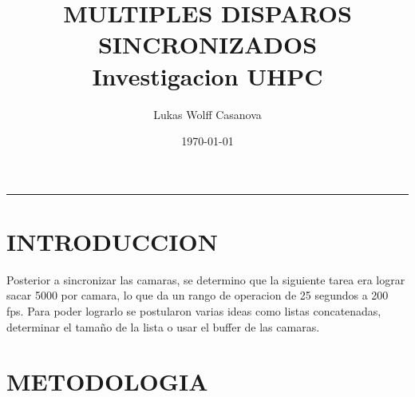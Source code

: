 \documentclass{article}
\title{\textbf{MULTIPLES DISPAROS SINCRONIZADOS}\\[0.5em] \large Investigacion UHPC}
\author{Lukas Wolff Casanova}
\date{\today}
\begin{document}
\maketitle
\hrule

\section{INTRODUCCION}

\noindent Posterior a sincronizar las camaras, se determino que la siguiente tarea era lograr sacar 5000 por camara, lo que da un rango de operacion de 25 segundos a 
200 fps. Para poder lograrlo se postularon varias ideas como listas concatenadas, determinar el tamaño de la lista o usar el buffer de las camaras.

\section{METODOLOGIA}
\end{document}
